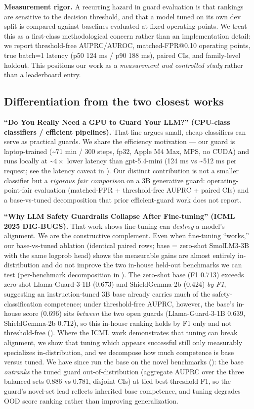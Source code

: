 \documentclass[sigconf,nonacm]{acmart}
\begin{document}
\textbf{Measurement rigor.} A recurring hazard in guard evaluation is that rankings are sensitive to the decision threshold, and that a model tuned on its own dev split is compared against baselines evaluated at fixed operating points. We treat this as a first-class methodological concern rather than an implementation detail: we report threshold-free AUPRC/AUROC, matched-FPR@0.10 operating points, true batch=1 latency (p50 124 ms / p90 188 ms), paired CIs, and family-level holdout. This positions our work as a \emph{measurement and controlled study} rather than a leaderboard entry.

\subsection{Differentiation from the two closest works}

\textbf{``Do You Really Need a GPU to Guard Your LLM?'' \cite{majhi2025gpuguard} (CPU-class classifiers / efficient pipelines).} That line argues small, cheap classifiers can serve as practical guards. We share the efficiency motivation --- our guard is laptop-trained (\textasciitilde{}71 min / 300 steps, fp32, Apple M4 Max, MPS, no CUDA) and runs locally at \textasciitilde{}$4\times$ lower latency than gpt-5.4-mini (124 ms vs \textasciitilde{}512 ms per request; see the latency caveat in ). Our distinct contribution is not a smaller classifier but a \emph{rigorous fair comparison} on a 3B generative guard: operating-point-fair evaluation (matched-FPR + threshold-free AUPRC + paired CIs) and a base-vs-tuned decomposition that prior efficient-guard work does not report.

\textbf{``Why LLM Safety Guardrails Collapse After Fine-tuning'' \cite{hsiung2025guardrails} (ICML 2025 DIG-BUGS).} That work shows fine-tuning can \emph{destroy} a model's alignment. We are the constructive complement. Even when fine-tuning ``works,'' our base-vs-tuned ablation (identical paired rows; base = zero-shot SmolLM3-3B with the same logprob head) shows the measurable gains are almost entirely in-distribution and do not improve the two in-house held-out benchmarks we can test (per-benchmark decomposition in ). The zero-shot base (F1 0.713) exceeds zero-shot Llama-Guard-3-1B (0.673) and ShieldGemma-2b (0.424) \emph{by F1}, suggesting an instruction-tuned 3B base already carries much of the safety-classification competence; under threshold-free AUPRC, however, the base's in-house score (0.696) sits \emph{between} the two open guards (Llama-Guard-3-1B 0.639, ShieldGemma-2b 0.712), so this in-house ranking holds by F1 only and not threshold-free (). Where the ICML work demonstrates that tuning can break alignment, we show that tuning which appears successful still only measurably specializes in-distribution, and we decompose how much competence is base versus tuned. We have since run the base on the novel benchmarks (): the base \emph{outranks} the tuned guard out-of-distribution (aggregate AUPRC over the three balanced sets 0.886 vs 0.781, disjoint CIs) at tied best-threshold F1, so the guard's novel-set lead reflects inherited base competence, and tuning degrades OOD score ranking rather than improving generalization.
\end{document}

